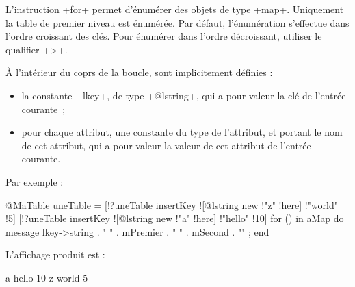 L'instruction \ggs+for+ permet d'énumérer des objets de type \ggs+map+. Uniquement la table de premier niveau est énumérée. Par défaut, l'énumération s'effectue dans l'ordre croissant des clés. Pour énumérer dans l'ordre décroissant, utiliser le qualifier \ggs+>+.

À l'intérieur du coprs de la boucle, sont implicitement définies :
\begin{itemize}
  \item la constante \ggs+lkey+, de type \ggs+@lstring+, qui a pour valeur la clé de l'entrée courante~;
  \item pour chaque attribut, une constante du type de l'attribut, et portant le nom de cet attribut, qui a pour valeur la valeur de cet attribut de l'entrée courante.
\end{itemize}

Par exemple :
\begin{galgas}
@MaTable uneTable = {}
[!?uneTable insertKey ![@lstring new !"z" !here] !"world" !5]
[!?uneTable insertKey ![@lstring new !"a" !here] !"hello" !10]
for () in aMap do
  message lkey->string . " " . mPremier . " " . mSecond . "\n" ;
end
\end{galgas}

L'affichage produit est :

\begin{galgas}
a hello 10
z world 5
\end{galgas}

